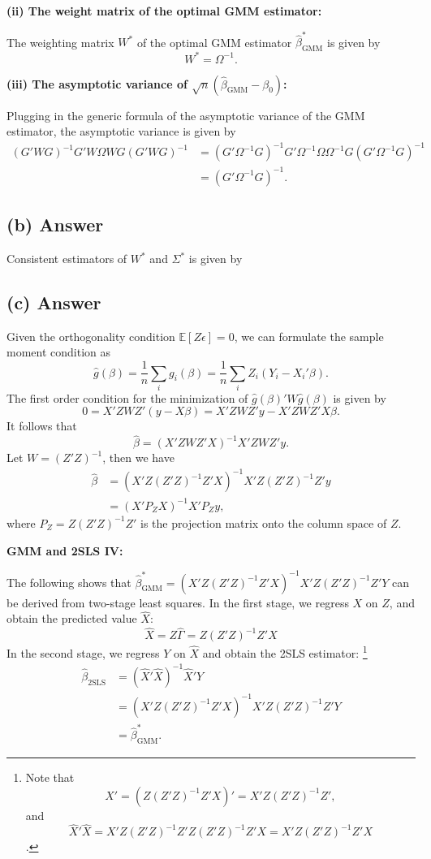 \documentclass[11pt]{article}
\theoremstyle{definition}
\theoremstyle{boldtitle} %
\numberwithin{equation}{section}
\numberwithin{figure}{section}
\numberwithin{table}{section}
\begin{document}
\vspace{5mm}
\noindent \textbf{(ii) The weight matrix of the optimal GMM estimator:}

The weighting matrix $W^*$ of the optimal GMM estimator $\hat{\beta}^*_{\text{GMM}}$ is given by 
\[
W^* = \Omega^{-1}.
\]

\vspace{5mm}
\noindent \textbf{(iii) The asymptotic variance of $\sqrt{n} \left( \hat{\beta}_{\text{GMM}} - \beta_0 \right)$:}

Plugging in the generic formula of the asymptotic variance of the GMM estimator,
the asymptotic variance is given by 
\begin{align*}
    (G'WG)^{-1}G'W\Omega W G(G'WG)^{-1} 
    & = (G'\Omega^{-1}G)^{-1}G'\Omega^{-1}\Omega \Omega^{-1} G(G'\Omega^{-1}G)^{-1} \\
    & = (G'\Omega^{-1}G)^{-1}.
\end{align*}


\subsection{(b) Answer}
Consistent estimators of $W^*$ and $\Sigma^*$ is given by 


\subsection{(c) Answer}
Given the orthogonality condition $\mathbb{E}[Z\epsilon] = 0$, we can formulate the sample moment condition as
\[
\hat{g}(\beta) = \frac{1}{n} \sum_i g_i(\beta) = \frac{1}{n} \sum_i Z_i (Y_i - X_i'\beta).
\]
The first order condition for the minimization of $\hat{g}(\beta)' W \hat{g}(\beta)$ is given by
\[
0 = X'Z W Z'(y - X\beta) = X'Z W Z' y - X'Z W Z' X \beta.
\]
It follows that 
\[
\hat{\beta} = \left( X'Z W Z' X \right)^{-1} X'Z W Z' y.
\]
Let $W = (Z'Z)^{-1}$, then we have
\begin{align*}
\hat{\beta} & = \left( X'Z (Z'Z)^{-1} Z' X \right)^{-1} X'Z (Z'Z)^{-1} Z' y \\ 
    & = \left( X' P_Z X \right)^{-1} X' P_Z y,
\end{align*}
where $P_Z = Z(Z'Z)^{-1}Z'$ is the projection matrix onto the column space of $Z$.

\vspace{10mm}
\noindent \textbf{GMM and 2SLS IV:}

The following shows that $\hat{\beta}_{\text{GMM}}^* = \left( X'Z (Z'Z)^{-1} Z' X \right)^{-1} X'Z (Z'Z)^{-1} Z' Y$ can be derived from two-stage least squares.
In the first stage, we regress $X$ on $Z$, and obtain the predicted value $\hat{X}$:
\[
\hat{X} = Z \hat{\Gamma} = Z(Z'Z)^{-1}Z'X
\]
In the second stage, we regress $Y$ on $\hat{X}$ and obtain the 2SLS estimator:%
\footnote{
Note that 
\[
\hat{X}' = (Z(Z'Z)^{-1}Z'X)' = X'Z(Z'Z)^{-1}Z',
\]
and
\[
\hat{X}' \hat{X} = X'Z(Z'Z)^{-1}Z'Z(Z'Z)^{-1}Z'X = X'Z(Z'Z)^{-1}Z'X
\].
}
\begin{align*}
\hat{\beta}_{\text{2SLS}} & = (\hat{X}'\hat{X})^{-1}\hat{X}'Y \\ 
& = (X'Z(Z'Z)^{-1}Z'X)^{-1} X'Z(Z'Z)^{-1}Z' Y \\ 
& = \hat{\beta}_{\text{GMM}}^*.
\end{align*}
\end{document}
